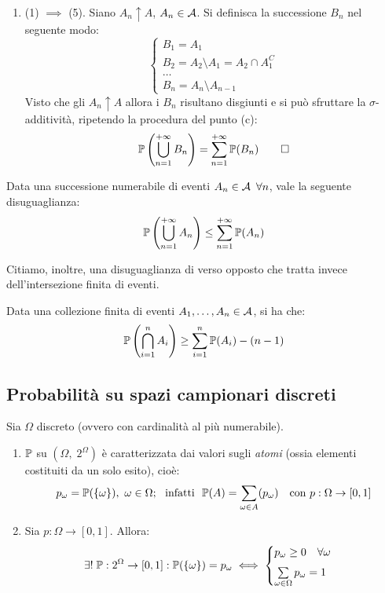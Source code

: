 \begin{dimo}
\begin{enumerate}[label=(\alph*)]
    \item (1) $\implies$ (5).
      Siano $A_n \uparrow A$, $A_n \in \mathcal A$.
      Si definisca la successione $B_n$ nel seguente modo:
      $$
      \begin{cases}
        B_1 = A_1\\
        B_2 = A_2 \setminus A_1 = A_2 \cap A_1^C\\
        \dots \\
        B_n = A_n \setminus A_{n-1}
      \end{cases}
      $$
      Visto che gli $A_n \uparrow A$ allora i $B_n$ risultano disgiunti e si può sfruttare la $\sigma$-additività, ripetendo la procedura del punto (c):
      $$\mathbb P \left(\bigcup\limits_{n=1}^{+\infty} B_n \right) = \sum\limits_{n=1}^{+\infty} \mathbb P(B_n) \qedhere$$
  \end{enumerate}
\end{dimo}

\bigskip
\begin{prop}
  Data una successione numerabile di eventi $A_n \in \mathcal A \enspace \forall n$, vale la seguente disuguaglianza:
  $$\mathbb P \left( \bigcup_{n=1}^{+\infty} A_n \right) \le \sum_{n=1}^{+\infty} \mathbb P(A_n)$$
\end{prop}

Citiamo, inoltre, una disuguaglianza di verso opposto che tratta invece dell'intersezione finita di eventi.
\begin{prop}
  Data una collezione finita di eventi $A_1, \dots, A_n \in \mathcal A$, si ha che:
  $$\mathbb P \left( \bigcap_{i=1}^n A_i \right) \ge \sum_{i=1}^n \mathbb P(A_i) - (n-1)$$
\end{prop}

\subsection{Probabilità su spazi campionari discreti} %
\begin{teo}
Sia $\Omega$ discreto (ovvero con cardinalità al più numerabile).
  \begin{enumerate}
    \item $\mathbb P$ su $(\Omega, \; 2^\Omega)$ è caratterizzata dai valori sugli \textit{atomi} (ossia elementi costituiti da un solo esito), cioè:
    $$p_\omega = \mathbb P(\{\omega\}), \ \omega \in \Omega; \ \text{ infatti } \ \mathbb P(A) = \sum\limits_{\omega \in A} (p_\omega) \quad \text{con } p:\Omega \to [0,1]$$
    \item Sia $p:\Omega \to [0,1]$. Allora:
      $$\exists! \; \mathbb P: 2^\Omega \to [0,1]: \mathbb P(\{\omega\}) = p_\omega \iff \begin{cases} p_\omega \geq 0 \quad \forall \omega \\[4pt] \sum\limits_{\omega \in \Omega} p_\omega = 1 \end{cases}$$
  \end{enumerate}
\end{teo}

